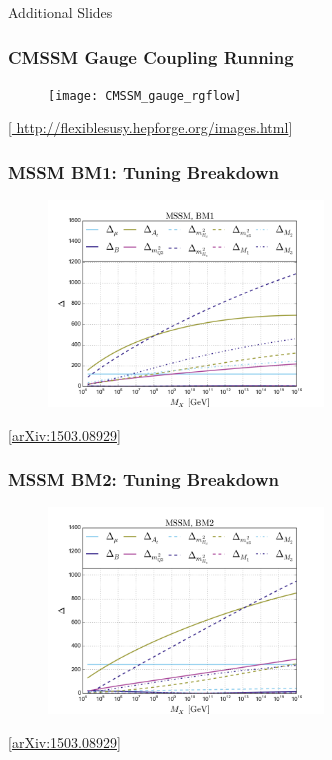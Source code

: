 \documentclass[10pt,aspectratio=169]{beamer}
\begin{document}
\appendix

\begin{frame}
  \begin{center}
    {
      \Large
      Additional Slides
    }
  \end{center}
\end{frame}

\begin{frame}
  \frametitle{CMSSM Gauge Coupling Running}
  \begin{figure}
    \centering
    \texttt{[image: CMSSM\_gauge\_rgflow]}
  \end{figure}
  \vspace*{-20pt}
  \begin{center}
    {\tiny [\href{http://flexiblesusy.hepforge.org/images.html}{%
          http://flexiblesusy.hepforge.org/images.html}]}
  \end{center}
\end{frame}

\begin{frame}
  \frametitle{MSSM BM1: Tuning Breakdown}
  \begin{figure}
    \includegraphics[width=0.65\textwidth]{mssm_BM1_all_tuning_data_bw_var}
  \end{figure}
  \begin{center}
    \tiny [\href{https://arxiv.org/abs/1503.08929}{arXiv:1503.08929}]
  \end{center}
\end{frame}

\begin{frame}
  \frametitle{MSSM BM2: Tuning Breakdown}
  \begin{figure}
    \includegraphics[width=0.65\textwidth]{mssm_BM2_all_tuning_data_bw_var}
  \end{figure}
  \begin{center}
    \tiny [\href{https://arxiv.org/abs/1503.08929}{arXiv:1503.08929}]
  \end{center}
\end{frame}
\end{document}
